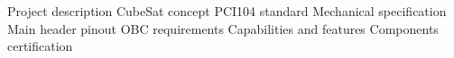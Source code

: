
\chap Project description
\sec CubeSat concept
\sec PCI104 standard
\secc Mechanical specification
\secc Main header pinout
\sec OBC requirements
\secc Capabilities and features 
\secc Components certification
